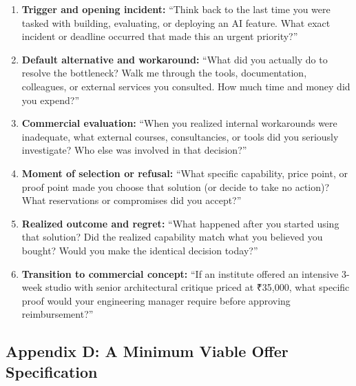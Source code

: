 \begin{enumerate}
    \item \textbf{Trigger and opening incident:} ``Think back to the last time you were tasked with building, evaluating, or deploying an AI feature. What exact incident or deadline occurred that made this an urgent priority?''
    \item \textbf{Default alternative and workaround:} ``What did you actually do to resolve the bottleneck? Walk me through the tools, documentation, colleagues, or external services you consulted. How much time and money did you expend?''
    \item \textbf{Commercial evaluation:} ``When you realized internal workarounds were inadequate, what external courses, consultancies, or tools did you seriously investigate? Who else was involved in that decision?''
    \item \textbf{Moment of selection or refusal:} ``What specific capability, price point, or proof point made you choose that solution (or decide to take no action)? What reservations or compromises did you accept?''
    \item \textbf{Realized outcome and regret:} ``What happened after you started using that solution? Did the realized capability match what you believed you bought? Would you make the identical decision today?''
    \item \textbf{Transition to commercial concept:} ``If an institute offered an intensive 3-week studio with senior architectural critique priced at ₹35,000, what specific proof would your engineering manager require before approving reimbursement?''
\end{enumerate}

\subsection*{Appendix D: A Minimum Viable Offer Specification}

